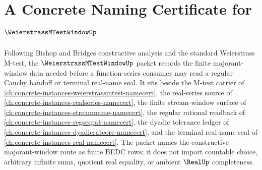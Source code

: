\chapter{A Concrete Naming Certificate for $\WeierstrassMTestWindowUp$}
\label{ch:concrete-instances-weierstrass-m-test-window-namecert}

Following Bishop and Bridges constructive analysis and the standard Weierstrass M-test, the $\WeierstrassMTestWindowUp$ packet records the finite majorant-window data needed before a function-series consumer may read a regular Cauchy handoff or terminal real-name seal. It sits beside the M-test carrier of \autoref{ch:concrete-instances-weierstrassmtest-namecert}, the real-series source of \autoref{ch:concrete-instances-realseries-namecert}, the finite stream-window surface of \autoref{ch:concrete-instances-streamname-namecert}, the regular rational readback of \autoref{ch:concrete-instances-regseqrat-namecert}, the dyadic tolerance ledger of \autoref{ch:concrete-instances-dyadicratcore-namecert}, and the terminal real-name seal of \autoref{ch:concrete-instances-real-namecert}. The packet names the constructive majorant-window route as finite BEDC rows; it does not import countable choice, arbitrary infinite sums, quotient real equality, or ambient $\RealUp$ completeness.

